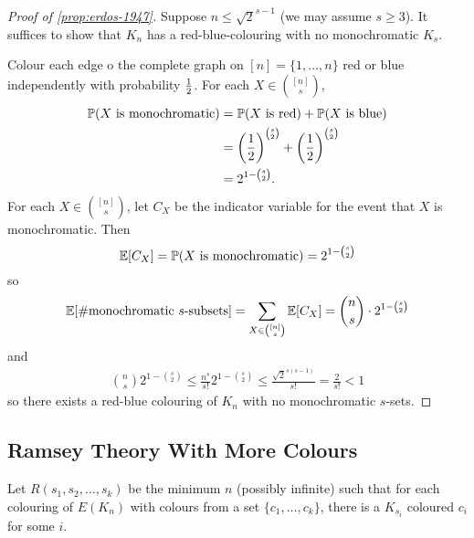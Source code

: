 \documentclass[main.tex]{subfiles}
\begin{document}
\begin{proof}[Proof of \th\ref{prop:erdos-1947}]%
  Suppose $n\leq\sqrt{2}^{s-1}$ (we may assume $s\geq 3$).
  It suffices to show that $K_n$ has a red-blue-colouring with no monochromatic $K_s$.

  Colour each edge o the complete graph on $[n] = \{1,\ldots,n\}$ red or blue
  independently with probability $\frac{1}{2}$.
  For each $X\in\binom{[n]}{s}$,
  \begin{align*}
    \mathbb P(X\text{ is monochromatic})
    &= \mathbb P(X\text{ is red}) + \mathbb P(X\text{ is blue}) \\
    &= \left(\frac{1}{2}\right)^{\binom s 2} + \left(\frac{1}{2}\right)^{\binom s 2} \\
    &= 2^{1 - \binom s 2}.
  \end{align*}
  For each $X\in\binom{[n]}{s}$, let $C_X$ be the indicator variable for the
  event that $X$ is monochromatic.
  Then
  \[
    \mathbb E[C_X] = \mathbb P(X\text{ is monochromatic}) = 2^{1-\binom s 2}
  \]
  so
  \begin{align*}
    \mathbb E[\#\text{monochromatic $s$-subsets}] = \sum_{X\in\binom{[n]}{s}}\mathbb E[C_X]
    = \binom{n}{s}\cdot2^{1-\binom{s}{2}}
  \end{align*}
  and
  \begin{align*}
  \binom{n}{s}2^{1-\binom s 2}\leq\frac{n^s}{s!}2^{1-\binom s 2}
  \leq\frac{\sqrt{2}^{s(s-1)}}{s!} = \frac{2}{s!} < 1
  \end{align*}
  so there exists a red-blue colouring of $K_n$ with no monochromatic $s$-sets.
\end{proof}
\subsection{Ramsey Theory With More Colours}
Let $R(s_1,s_2,\ldots,s_k)$ be the minimum $n$ (possibly infinite) such that
for each colouring of $E(K_n)$ with colours from a set $\{c_1,\ldots,c_k\}$,
there is a $K_{s_i}$ coloured $c_i$ for some $i$.
\end{document}
